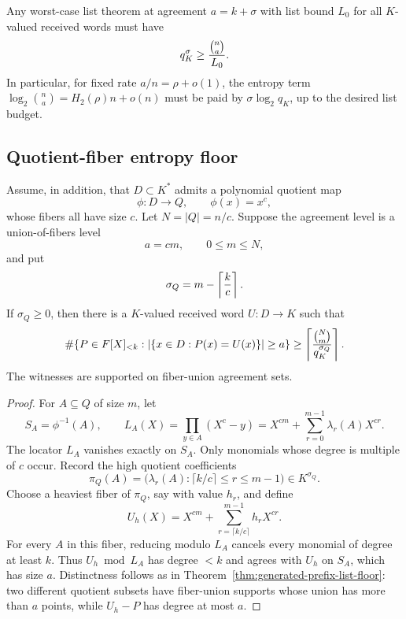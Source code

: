 \begin{corollary}
\label{cor:generated-reserve-necessary}
Any worst-case list theorem at agreement \(a=k+\sigma\) with list bound \(L_0\)
for all \(K\)-valued received words must have
\[
  q_K^\sigma\geq {\binom{n}{a}\over L_0}.
\]
In particular, for fixed rate \(a/n=\rho+o(1)\), the entropy term
\(\log_2\binom{n}{a}=H_2(\rho)n+o(n)\) must be paid by
\(\sigma\log_2 q_K\), up to the desired list budget.
\end{corollary}

\subsection{Quotient-fiber entropy floor}

\begin{theorem}
\label{thm:quotient-prefix-list-floor}
Assume, in addition, that \(D\subset K^*\) admits a polynomial quotient map
\[
  \phi:D\to Q,
  \qquad \phi(x)=x^c,
\]
whose fibers all have size \(c\).  Let \(N=|Q|=n/c\).  Suppose the agreement
level is a union-of-fibers level
\[
  a=cm,
  \qquad 0\leq m\leq N,
\]
and put
\[
  \sigma_Q=m-\left\lceil {k\over c}\right\rceil .
\]
If \(\sigma_Q\geq0\), then there is a \(K\)-valued received word
\(U:D\to K\) such that
\[
  \#\{P\in F[X]_{<k}: |\{x\in D:P(x)=U(x)\}|\geq a\}
  \geq
  \left\lceil {\binom{N}{m}\over q_K^{\sigma_Q}}\right\rceil .
\]
The witnesses are supported on fiber-union agreement sets.
\end{theorem}

\begin{proof}
For \(A\subseteq Q\) of size \(m\), let
\[
  S_A=\phi^{-1}(A),
  \qquad
  L_A(X)=\prod_{y\in A}(X^c-y)
        =X^{cm}+\sum_{r=0}^{m-1}\lambda_r(A)X^{cr}.
\]
The locator \(L_A\) vanishes exactly on \(S_A\).  Only monomials whose degree is
multiple of \(c\) occur.  Record the high quotient coefficients
\[
  \pi_Q(A)=\bigl(\lambda_r(A):\lceil k/c\rceil\leq r\leq m-1\bigr)
  \in K^{\sigma_Q}.
\]
Choose a heaviest fiber of \(\pi_Q\), say with value \(h_r\), and define
\[
  U_h(X)=X^{cm}+\sum_{r=\lceil k/c\rceil}^{m-1}h_r X^{cr}.
\]
For every \(A\) in this fiber, reducing modulo \(L_A\) cancels every monomial
of degree at least \(k\).  Thus \(U_h\bmod L_A\) has degree \(<k\) and agrees
with \(U_h\) on \(S_A\), which has size \(a\).  Distinctness follows as in
Theorem~\ref{thm:generated-prefix-list-floor}: two different quotient subsets
have fiber-union supports whose union has more than \(a\) points, while
\(U_h-P\) has degree at most \(a\).
\end{proof}

